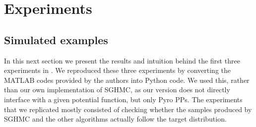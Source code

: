
\section{Experiments}
\subsection{Simulated examples}
In this next section we present the results and intuition behind the first three experiments in \cite{sghmc}. We reproduced these three experiments by converting the MATLAB codes provided by the authors \citeauthor{sghmc} \cite{simu_code} into Python code. We used this, rather than our own implementation of SGHMC, as our version does not directly interface with a given potential function, but only Pyro PPs. The experiments that we replicated mostly consisted of checking whether the samples produced by SGHMC and the other algorithms actually follow the target distribution.

